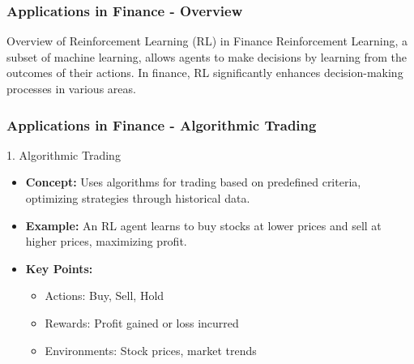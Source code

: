 \documentclass{beamer}
\begin{document}
\begin{frame}[fragile]
    \frametitle{Applications in Finance - Overview}
    \begin{block}{Overview of Reinforcement Learning (RL) in Finance}
        Reinforcement Learning, a subset of machine learning, allows agents to make decisions by learning from the outcomes of their actions. In finance, RL significantly enhances decision-making processes in various areas.
    \end{block}
\end{frame}

\begin{frame}[fragile]
    \frametitle{Applications in Finance - Algorithmic Trading}
    \begin{block}{1. Algorithmic Trading}
        \begin{itemize}
            \item \textbf{Concept:} Uses algorithms for trading based on predefined criteria, optimizing strategies through historical data.
            \item \textbf{Example:} An RL agent learns to buy stocks at lower prices and sell at higher prices, maximizing profit.
        \end{itemize}
        \begin{itemize}
            \item \textbf{Key Points:}
            \begin{itemize}
                \item Actions: Buy, Sell, Hold
                \item Rewards: Profit gained or loss incurred
                \item Environments: Stock prices, market trends
            \end{itemize}
        \end{itemize}
    \end{block}
\end{frame}
\end{document}
